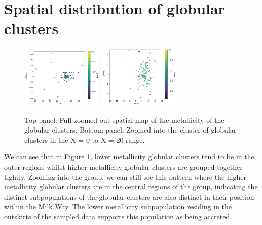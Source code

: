 \documentclass[fleqn,usenatbib]{mnras}
\begin{document}
\section{Spatial distribution of globular clusters}
\begin{figure}
    \centering
    \includegraphics[width=0.35\textwidth]{xzfeh.png}
    \includegraphics[width=0.35\textwidth]{xzfeh1.png}
    \caption{Top panel: Full zoomed out spatial map of the metallicity of the globular clusters.
    Bottom panel: Zoomed into the cluster of globular clusters in the X = 0 to X = 20 range.}
    \label{fig:xzfeh}
\end{figure}

We can see that in Figure \ref{fig:xzfeh}, lower metallicity globular clusters tend to be in the outer 
regions whilst higher metallicity globular clusters are grouped together tightly. Zooming into the group, 
we can still see this pattern where the higher metallicity globular clusters are in the central regions 
of the group, indicating the distinct subpopulations of the globular clusters are also distinct in their 
position within the Milk Way. The lower metallicity subpopulation residing in the outskirts of the sampled 
data supports this population as being accreted.
\end{document}
